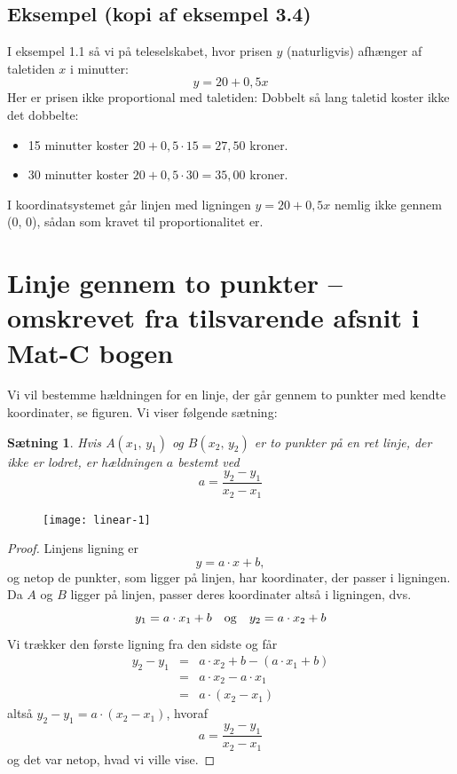 \documentclass[12pt,oneside,a4paper]{article}
\newcommand{\bas}{\begin{eqnarray*}}
\newcommand{\eas}{\end{eqnarray*}}
\newtheorem{thm}{Sætning}[section]
\begin{document}
\subsection{Eksempel (kopi af eksempel 3.4)}
I eksempel 1.1 så vi på teleselskabet, hvor prisen $y$ (naturligvis) afhænger af
taletiden $x$ i minutter:
$$
y=20+0,5x
$$
Her er prisen ikke proportional med taletiden: Dobbelt så lang taletid koster ikke
det dobbelte:
\begin{itemize}
    \item 15 minutter koster $20+0,5\cdot 15 = 27,50$ kroner.
    \item 30 minutter koster $20+0,5\cdot 30 = 35,00$ kroner.
\end{itemize}
I koordinatsystemet går linjen med ligningen $y=20+0,5x$ nemlig ikke gennem (0, 0),
sådan som kravet til proportionalitet er.

\section{Linje gennem to punkter -- omskrevet fra tilsvarende afsnit i Mat-C bogen}
Vi vil bestemme hældningen for en linje, der går gennem
to punkter med kendte koordinater, se figuren. Vi viser følgende sætning:
\begin{thm}
    Hvis $A(x_1,\,y_1)$ og $B(x_2,\,y_2)$ er to punkter på en ret linje, der ikke
    er lodret, er hældningen $a$ bestemt ved
    $$
    a = \frac{y_2-y_1}{x_2-x_1}
    $$
\end{thm}

\begin{figure}[ht]
    \centering
    \texttt{[image: linear-1]}
    \label{linear-1}
\end{figure}

\begin{proof}
    Linjens ligning er
    $$
    y = a\cdot x + b,
    $$
    og netop de punkter, som ligger på linjen, har koordinater, der passer i
    ligningen.  Da $A$ og $B$ ligger på linjen, passer deres koordinater altså
    i ligningen, dvs.
    $$
    y_1 = a\cdot x_1 + b \quad {\rm og} \quad y_2 = a\cdot x_2 + b 
    $$
    Vi trækker den første ligning fra den sidste og får
    \bas
    y_2 - y_1 &=& a\cdot x_2 + b - (a\cdot x_1 + b) \\
              &=& a\cdot x_2 - a\cdot x_1 \\
              &=& a\cdot \left(x_2-x_1\right) 
    \eas
    altså $y_2-y_1 = a \cdot \left(x_2-x_1\right)$, hvoraf
    $$
    a = \frac{y_2-y_1}{x_2-x_1}
    $$
    og det var netop, hvad vi ville vise.
\end{proof}
\end{document}
